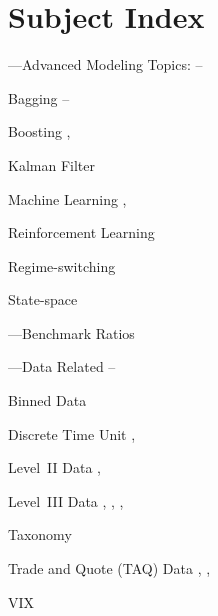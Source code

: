 \chapter*{Subject Index}
\nopagebreak

\begin{minipage}{0.40\textwidth}
\noindent ---Advanced Modeling Topics: \pageref{in:adv_model}--\pageref{in:adv_model_end}
	\begin{flushright}
	Bagging  \pageref{in:bagging}--\pageref{in:bagging_end} \par
	Boosting \pageref{in:boost1}, \pageref{in:boost2} \par
	Kalman Filter \pageref{in:kalman} \par
	Machine Learning \pageref{in:machine1}, \pageref{in:machine2} \par
	Reinforcement Learning \pageref{in:re_learning} \par
	Regime-switching \pageref{in:regime} \par
	State-space \pageref{in:state_space}
	\end{flushright}


\noindent ---Benchmark Ratios \pageref{in:benchmark}


\noindent ---Data Related \pageref{in:data_related1}--\pageref{in:data_related2}
	\begin{flushright}
	Binned Data \pageref{in:binned_data} \par
	Discrete Time Unit \pageref{in:disc_time_unit1}, \pageref{in:disc_time_unit2} \par
	Level~II Data \pageref{in:level2dat1}, \pageref{in:level2dat2} \par
	Level~III Data \pageref{in:level3dat1}, \pageref{in:level3dat2}, \pageref{in:level3dat3}, \pageref{in:level3dat4} \par
	Taxonomy \pageref{in:taxonomy} \par
	Trade and Quote (TAQ) Data \pageref{in:taq1}, \pageref{in:taq2}, \pageref{in:taq3} \par 
	VIX \pageref{in:vix}
	\end{flushright}



\end{minipage}
